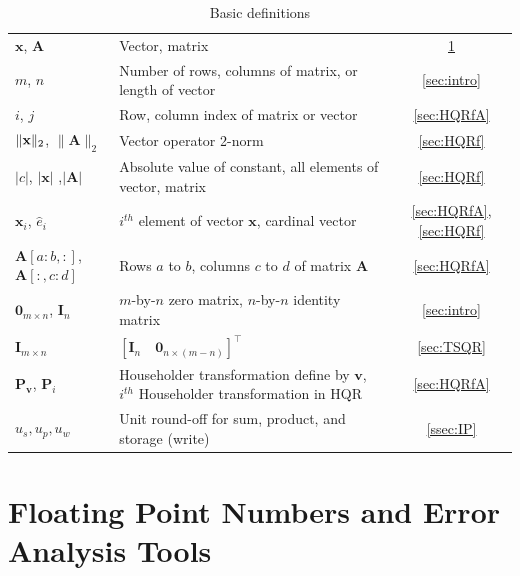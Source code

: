\documentclass[review,onefignum,onetabnum]{siamart190516}
\newcommand{\tth}{\theta}
\newcommand{\bb}[1]{\mathbf{#1}}
\begin{document}
\begin{table}[h!]
\begin{tabular}{|m{3cm}|m{9cm}|c|}
		\hline
		${\bb x}$, ${\bb A}$  & Vector, matrix  & \ref{sec:FPREA} \\
		$m$, $n$ & Number of rows, columns of matrix, or length of vector&  \ref{sec:intro}\\
		$i$, $j$ & Row, column index of matrix or vector & \ref{sec:HQRfA} \\
		$\|{\bf x}\|_2$, $\|\bb{A}\|_2$ & Vector operator 2-norm & \ref{sec:HQRf}\\
		$|c|$, $|\bb{x}|$ ,$|\bb{A}|$ & Absolute value of constant, all elements of vector, matrix & \ref{sec:HQRf} \\
		$\bb{x}_i$, $\hat{e}_i$  & $i^{th}$ element of vector $\bb{x}$, cardinal vector &  \ref{sec:HQRfA}, \ref{sec:HQRf}\\
		$\bb{A}[a:b,:]$, $\bb{A}[:,c:d]$ & Rows $a$ to $b$, columns $c$ to $d$ of matrix $\bb{A}$& \ref{sec:HQRfA}\\
		$\bb{0}_{m\times n}$, $\bb{I}_{n}$ & $m$-by-$n$ zero matrix, $n$-by-$n$ identity  matrix &  \ref{sec:intro}\\
		$\bb{I}_{m\times n}$ & $[\bb{I}_{n} \quad \bb{0}_{n \times (m-n)}]^{\top}$ & \ref{sec:TSQR}\\ \hline
		$\bb{P}_{\bb{v}}$, $\bb{P}_i$ & Householder transformation define by $\bb{v}$, $i^{th}$ Householder transformation in HQR& \ref{sec:HQRfA}\\
		\hline		
		$u_s, u_p, u_w$ & Unit round-off for sum, product, and storage (write) & \ref{ssec:IP}\\ 
		\hline
	\end{tabular}
	\caption{Basic definitions}
	\label{table:notation}
\end{table}

\section{Floating Point Numbers and Error Analysis Tools}\label{sec:FPREA}
\end{document}
